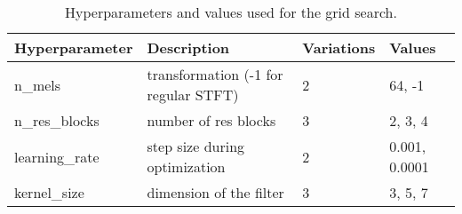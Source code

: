 \begin{table}[h]
    \centering
    \caption{Hyperparameters and values used for the grid search.}
    \label{tab:hyperparameters}
    \begin{tabular}{llll}
    \toprule
    \textbf{Hyperparameter} & \textbf{Description}                  & \textbf{Variations}   & \textbf{Values} \\
    \midrule
    n\_mels                 & transformation (-1 for regular STFT)  & 2                     & 64, -1 \\
    n\_res\_blocks          & number of res blocks                  & 3                     & 2, 3, 4 \\
    learning\_rate          & step size during optimization         & 2                     & 0.001, 0.0001 \\
    kernel\_size            & dimension of the filter               & 3                     & 3, 5, 7 \\
    \bottomrule
\end{tabular}

\end{table}